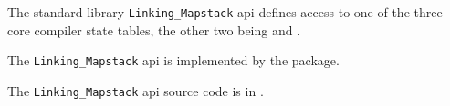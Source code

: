 
The standard library {\tt Linking\_Mapstack} api defines access to one of the three 
core compiler state tables, the other two being 
 and 
.

The {\tt Linking\_Mapstack} api is implemented by the  package.

The {\tt Linking\_Mapstack} api source code is in .







